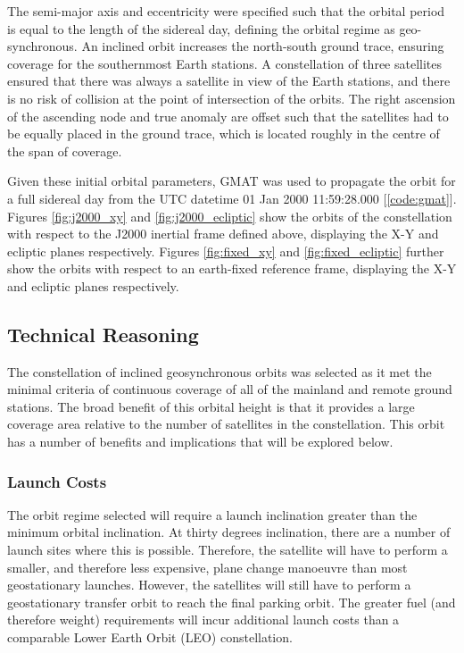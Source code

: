 \documentclass[12pt]{article}
\begin{document}
The semi-major axis and eccentricity were specified such that the orbital period is equal to the length of the sidereal day, defining the orbital regime as geo-synchronous. An inclined orbit increases the north-south ground trace, ensuring coverage for the southernmost Earth stations. A constellation of three satellites ensured that there was always a satellite in view of the Earth stations, and there is no risk of collision at the point of intersection of the orbits. The right ascension of the ascending node and true anomaly are offset such that the satellites had to be equally placed in the ground trace, which is located roughly in the centre of the span of coverage.

Given these initial orbital parameters, GMAT was used to propagate the orbit for a full sidereal day from the UTC datetime 01 Jan 2000 11:59:28.000 [\ref{code:gmat}]. Figures \ref{fig:j2000_xy} and \ref{fig:j2000_ecliptic}  show the orbits of the constellation with respect to the J2000 inertial frame defined above, displaying the X-Y and ecliptic planes respectively. Figures \ref{fig:fixed_xy} and \ref{fig:fixed_ecliptic}  further show the orbits with respect to an earth-fixed reference frame, displaying the X-Y and ecliptic planes respectively. 

\subsection{Technical Reasoning}
The constellation of inclined geosynchronous orbits was selected as it met the minimal criteria of continuous coverage of all of the mainland and remote ground stations. The broad benefit of this orbital height is that it provides a large coverage area relative to the number of satellites in the constellation. This orbit has a number of benefits and implications that will be explored below.  

\subsubsection{Launch Costs}
    The orbit regime selected will require a launch inclination greater than the minimum orbital inclination. At thirty degrees inclination, there are a number of launch sites where this is possible. Therefore, the satellite will have to perform a smaller, and therefore less expensive, plane change manoeuvre than most geostationary launches. However, the satellites will still have to perform a geostationary transfer orbit to reach the final parking orbit. The greater fuel (and therefore weight) requirements will incur additional launch costs than a comparable Lower Earth Orbit (LEO) constellation.  
    
\end{document}
